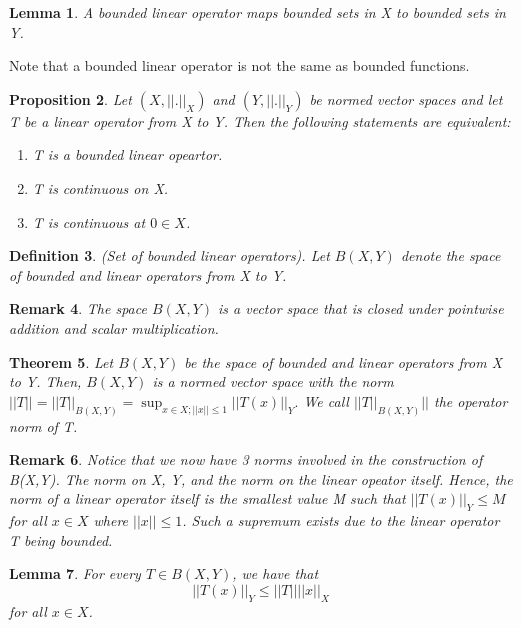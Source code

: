 \documentclass[twoside]{article}
\newcounter{lecnum}
\newtheorem{theorem}{Theorem}[lecnum]
\newtheorem{lemma}[theorem]{Lemma}
\newtheorem{proposition}[theorem]{Proposition}
\newtheorem{definition}[theorem]{Definition}
\newtheorem{remark}[theorem]{Remark}
\begin{document}
\begin{lemma}A bounded linear operator maps bounded sets in X to bounded sets in Y.
\end{lemma}

Note that a bounded linear operator is not the same as bounded functions.

\begin{proposition}Let $(X, ||.||_X)$ and $(Y,||.||_Y)$ be normed vector spaces and let T be a linear operator from X to Y. Then the following statements are equivalent:
\begin{enumerate}
\item T is a bounded linear opeartor.
\item T is continuous on X.
\item T is continuous at $0 \in X$.
\end{enumerate}
\end{proposition}

\begin{definition}(Set of bounded linear operators). Let $B(X,Y)$ denote the space of bounded and linear operators from X to Y.
\end{definition}

\begin{remark}The space $B(X,Y)$ is a vector space that is closed under pointwise addition and scalar multiplication.
\end{remark}

\begin{theorem}Let $B(X,Y)$ be the space of bounded and linear operators from X to Y. Then, $B(X,Y)$ is a normed vector space with the norm $||T|| = ||T||_{B(X,Y)} = \sup_{x \in X; ||x|| \leq 1}||T(x)||_Y.$ We call $||T||_{B(X,Y)}||$ the operator norm of T.
\end{theorem}

\begin{remark}Notice that we now have 3 norms involved in the construction of B(X,Y). The norm on X, Y, and the norm on the linear opeator itself. Hence, the norm of a linear operator itself is the smallest value M such that $||T(x)||_Y \leq M$ for all $x \in X$ where $||x|| \leq 1$. Such a supremum exists due to the linear operator T being bounded.
\end{remark}


\begin{lemma}For every $T \in B(X,Y)$, we have that
$$
||T(x)||_Y \leq ||T||||x||_X 
$$
for all $x \in X$.
\end{lemma}
\end{document}
